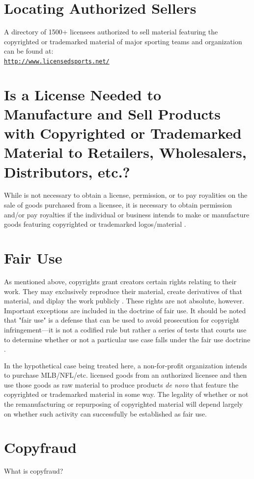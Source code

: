 \documentclass[letterpaper,11pt]{texMemo}
\begin{document}
\section*{Locating Authorized Sellers}
	A directory of 1500+ licensees authorized to sell material featuring the copyrighted or trademarked material of major sporting teams and organization can be found at:\\
  \texttt{\href{http://www.licensedsports.net/}{http://www.licensedsports.net/}}

\section*{Is a License Needed to Manufacture and Sell Products with Copyrighted or Trademarked Material to Retailers, Wholesalers, Distributors, etc.?}
  While is not necessary to obtain a license, permission, or to pay royalities on the sale of goods purchased from a licensee, it is necessary to obtain permission and/or pay royalties if the individual or business intends to make or manufacture goods featuring copyrighted or trademarked logos/material \cite{licensedsports}.

\section*{Fair Use}
  As mentioned above, copyrights grant creators certain rights relating to their work. They may exclusively reproduce their material, create derivatives of that material, and diplay the work publicly \cite{17usc106}. These rights are not absolute, however. Important exceptions are included in the doctrine of fair use. It should be noted that "fair use" is a defense that can be used to avoid prosecution for copyright infringement—it is not a codified rule but rather a series of tests that courts use to determine whether or not a particular use case falls under the fair use doctrine \cite{saracino}.

  In the hypothetical case being treated here, a non-for-profit organization intends to purchase MLB/NFL/etc. licensed goods from an authorized licensee and then use those goods as raw material to produce products \emph{de novo} that feature the copyrighted or trademarked material in some way. The legality of whether or not the remanufacturing or repurposing of copyrighted material will depend largely on whether such activity can successfully be established as fair use.


\section*{Copyfraud}
  What is copyfraud?


\end{document}
